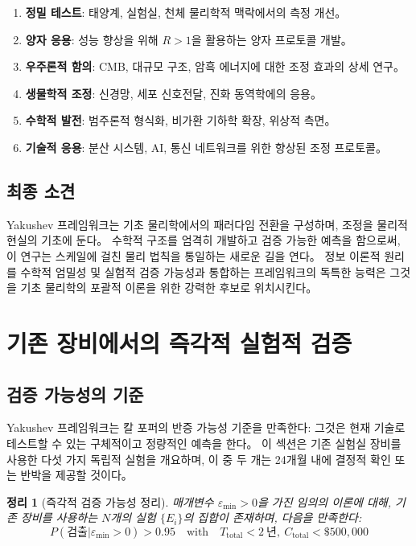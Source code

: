 \documentclass[11pt,a4paper]{article}
\newtheorem{theorem}{정리}
\begin{document}
\begin{enumerate}
\item \textbf{정밀 테스트}: 태양계, 실험실, 천체 물리학적 맥락에서의 측정 개선。

\item \textbf{양자 응용}: 성능 향상을 위해 $R>1$을 활용하는 양자 프로토콜 개발。

\item \textbf{우주론적 함의}: CMB, 대규모 구조, 암흑 에너지에 대한 조정 효과의 상세 연구。

\item \textbf{생물학적 조정}: 신경망, 세포 신호전달, 진화 동역학에의 응용。

\item \textbf{수학적 발전}: 범주론적 형식화, 비가환 기하학 확장, 위상적 측면。

\item \textbf{기술적 응용}: 분산 시스템, AI, 통신 네트워크를 위한 향상된 조정 프로토콜。
\end{enumerate}

\subsection{최종 소견}

Yakushev 프레임워크는 기초 물리학에서의 패러다임 전환을 구성하며, 조정을 물리적 현실의 기초에 둔다。 수학적 구조를 엄격히 개발하고 검증 가능한 예측을 함으로써, 이 연구는 스케일에 걸친 물리 법칙을 통일하는 새로운 길을 연다。 정보 이론적 원리를 수학적 엄밀성 및 실험적 검증 가능성과 통합하는 프레임워크의 독특한 능력은 그것을 기초 물리학의 포괄적 이론을 위한 강력한 후보로 위치시킨다。

\section{기존 장비에서의 즉각적 실험적 검증}
\label{sec:immediate-verification}

\subsection{검증 가능성의 기준}

Yakushev 프레임워크는 칼 포퍼의 반증 가능성 기준을 만족한다: 그것은 현재 기술로 테스트할 수 있는 구체적이고 정량적인 예측을 한다。 이 섹션은 기존 실험실 장비를 사용한 다섯 가지 독립적 실험을 개요하며, 이 중 두 개는 24개월 내에 결정적 확인 또는 반박을 제공할 것이다。

\begin{theorem}[즉각적 검증 가능성 정리]
매개변수 $\varepsilon_{\min} > 0$을 가진 임의의 이론에 대해, 기존 장비를 사용하는 $N$개의 실험 $\{E_i\}$의 집합이 존재하며, 다음을 만족한다:
\begin{equation}
	\boxed{P(\text{검출}|\varepsilon_{\min} > 0) > 0.95 \quad \text{with} \quad T_{\text{total}} < 2\ \text{년}, \ C_{\text{total}} < \$500,000}
\end{equation}
\end{theorem}
\end{document}
